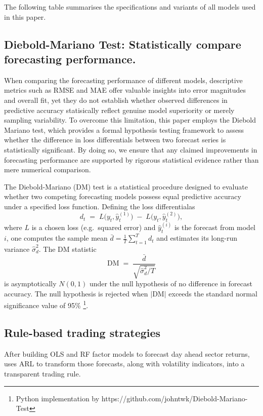 The following table summarises the specifications and variants of all models used in this paper.




\subsection{Diebold-Mariano Test: Statistically compare forecasting performance.}

When comparing the forecasting performance of different models, descriptive metrics such as RMSE and MAE offer valuable insights into error magnitudes and overall fit, yet they do not establish whether observed differences in predictive accuracy statisically reflect genuine model superiority or merely sampling variability. To overcome this limitation, this paper employs the Diebold Mariano test, which provides a formal hypothesis testing framework to assess whether the difference in loss differentials between two forecast series is statistically significant. By doing so, we ensure that any claimed improvements in forecasting performance are supported by rigorous statistical evidence rather than mere numerical comparison.


The Diebold-Mariano (DM) test is a statistical procedure designed to evaluate whether two competing forecasting models possess equal predictive accuracy under a specified loss function.  Defining the loss differentialas 
\[
d_t \;=\; L\bigl(y_t,\hat y^{(1)}_t\bigr)\;-\;L\bigl(y_t,\hat y^{(2)}_t\bigr),
\]
where \(L\) is a chosen loss (e.g.\ squared error) and \(\hat y^{(i)}_t\) is the forecast from model \(i\), one computes the sample mean \(\bar d = \frac{1}{T}\sum_{t=1}^T d_t\) and estimates its long-run variance \(\hat\sigma^2_d\).  The DM statistic
\[
\mathrm{DM} \;=\;\frac{\bar d}{\sqrt{\hat\sigma^2_d / T}}
\]
is asymptotically \(N(0,1)\) under the null hypothesis of no difference in forecast accuracy. The null hypothesis is rejected when \(\lvert\mathrm{DM}\rvert\) exceeds the standard normal significance value of 95\% \cite{dieman_2002} \footnote{Python implementation by https://github.com/johntwk/Diebold-Mariano-Test}.


\subsection{Rule-based trading strategies}
After building OLS and RF factor models to forecast day ahead sector returns,  uses ARL to transform those forecasts, along with volatility indicators, into a transparent trading rule. 

